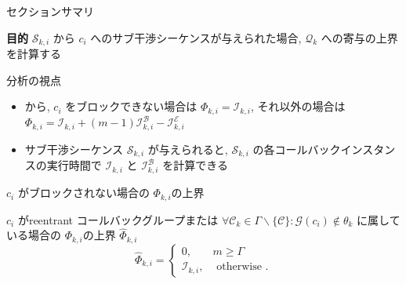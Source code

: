 \begin{frame}{セクションサマリ}
    \begin{itembox}[l]{\textbf{目的}}
        $\mathcal{S}_{k, i}$ から $c_{i}$ へのサブ干渉シーケンスが与えられた場合, $\mathcal{Q}_{k}$ への寄与の上界を計算する
    \end{itembox}
\end{frame}

\begin{frame}{分析の視点}
    \begin{itemize}
        \item {}から, $c_{i}$ をブロックできない場合は $\Phi_{k, i}=\mathcal{I}_{k, i}$, それ以外の場合は $\Phi_{k, i}=\mathcal{I}_{k, i}+(m-1) \mathcal{I}_{k, i}^{\mathcal{B}}-\mathcal{I}_{k, i}^{\mathcal{E}}$
        \item サブ干渉シーケンス $\mathcal{S}_{k, i}$ が与えられると, $\mathcal{S}_{k, i}$ の各コールバックインスタンスの実行時間で $\mathcal{I}_{k, i}$ と $\mathcal{I}_{k, i}^{\mathcal{B}}$ を計算できる
    \end{itemize}
\end{frame}

\begin{frame}{$c_{i}$ がブロックされない場合の $\Phi_{k, i}$の上界}
    \begin{definition}
        $c_{i}$ がreentrant コールバックグループまたは $\forall \mathcal{C}_{k} \in \Gamma \backslash\{\mathcal{C}\}: \mathcal{G}\left(c_{i}\right) \notin \theta_{k}$ に属している場合の $\Phi_{k, i}$の上界 $\hat{\Phi}_{k, i}$
        \begin{equation*}
            \hat{\Phi}_{k, i}=\left\{\begin{array}{lr}
                0,                  & m \geq \Gamma         \\
                \mathcal{I}_{k, i}, & \text { otherwise } .
            \end{array}\right.
        \end{equation*}
    \end{definition}
\end{frame}

